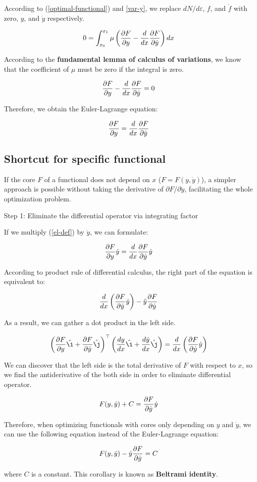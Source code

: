 According to (\ref{optimal-functional}) and \ref{var-y}, we replace
$dN/d\varepsilon$, $f$, and $\dot{f}$ with zero, $y$, and $\dot{y}$
respectively.

$$
0=\int_{x_0}^{x_1}\mu\left({\partial F\over\partial y}-{d\over dx}
{\partial F\over\partial\dot{y}}\right)dx
$$

According to the \textbf{fundamental lemma of calculus of variations}, we know
that the coefficient of $\mu$ must be zero if the integral is zero.

$$
{\partial F\over\partial y}-{d\over dx}{\partial F\over\partial\dot{y}}=0
$$

Therefore, we obtain the Euler-Lagrange equation:

\begin{equation}
	{\partial F\over\partial y}={d\over dx}{\partial F\over\partial\dot{y}}
	\label{el-def}
\end{equation}

\subsection{Shortcut for specific functional}

If the core $F$ of a functional does not depend on $x$ ($F=F(y,\dot{y})$), a
simpler approach is possible without taking the derivative of $\partial
F/\partial\dot{y}$, facilitating the whole optimization problem.

\begin{flushleft}
	Step 1: Eliminate the differential operator via integrating factor
\end{flushleft}

If we multiply (\ref{el-def}) by $\dot{y}$, we can formulate:

$$
{\partial F\over\partial y}\dot{y}=
{d\over dx}{\partial F\over\partial\dot{y}}\dot{y}
$$

According to product rule of differential calculus, the right part of the
equation is equivalent to:

$$
{d\over dx}\left({\partial F\over\partial\dot{y}}\dot{y}\right)
-\ddot{y}{\partial F\over\partial\dot{y}}
$$

As a result, we can gather a dot product in the left side.

$$
\left({\partial F\over\partial y}\hat{\i}
+{\partial F\over\partial\dot{y}}\hat{\j}\right)^\top
\left({dy\over dx}\hat{\i}+{d\dot{y}\over dx}\hat{\j}\right)
={d\over dx}\left({\partial F\over\partial\dot{y}}\dot{y}\right)
$$

We can discover that the left side is the total derivative of $F$ with respect
to $x$, so we find the antiderivative of the both side in order to eliminate
differential operator.

$$
F(y,\dot{y})+C={\partial F\over\partial\dot{y}}\dot{y}
$$

Therefore, when optimizing functionals with cores only depending on $y$ and
$\dot{y}$, we can use the following equation instead of the Euler-Lagrange
equation:

$$
F(y,\dot{y})-\dot{y}{\partial F\over\partial\dot{y}}=C
$$

where $C$ is a constant. This corollary is known as \textbf{Beltrami identity}.
